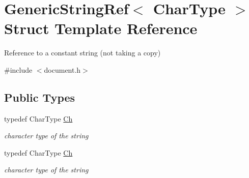 \hypertarget{struct_generic_string_ref}{}\section{Generic\+String\+Ref$<$ Char\+Type $>$ Struct Template Reference}
\label{struct_generic_string_ref}


Reference to a constant string (not taking a copy)  




{\ttfamily \#include $<$document.\+h$>$}

\subsection*{Public Types}
\begin{DoxyCompactItemize}
\item 
typedef Char\+Type \hyperlink{struct_generic_string_ref_a16908c3fce41be380061330c14ba2140}{Ch}\hypertarget{struct_generic_string_ref_a16908c3fce41be380061330c14ba2140}{}\label{struct_generic_string_ref_a16908c3fce41be380061330c14ba2140}

\begin{DoxyCompactList}\small\item\em character type of the string \end{DoxyCompactList}\item 
typedef Char\+Type \hyperlink{struct_generic_string_ref_a16908c3fce41be380061330c14ba2140}{Ch}\hypertarget{struct_generic_string_ref_a16908c3fce41be380061330c14ba2140}{}\label{struct_generic_string_ref_a16908c3fce41be380061330c14ba2140}

\begin{DoxyCompactList}\small\item\em character type of the string \end{DoxyCompactList}\end{DoxyCompactItemize}
